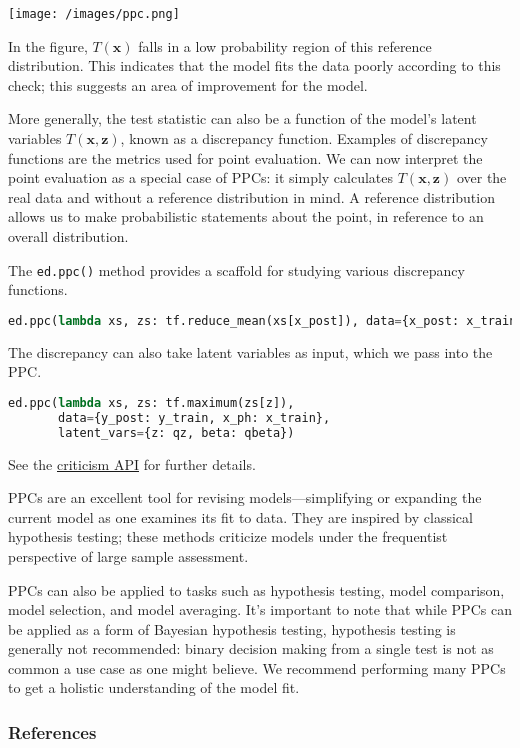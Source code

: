 \texttt{[image: /images/ppc.png]}

In the figure, $T(\mathbf{x})$ falls in a low probability region of
this reference distribution. This indicates that the model fits the
data poorly according to this check; this suggests an area of
improvement for the model.

More generally, the test statistic can also be a function of the
model's latent variables $T(\mathbf{x}, \mathbf{z})$, known as a
discrepancy function.  Examples of discrepancy functions are the
metrics used for point evaluation. We can now interpret the
point evaluation as a special case of PPCs: it simply calculates
$T(\mathbf{x}, \mathbf{z})$ over the real data and without a reference
distribution in mind. A reference distribution allows us to make
probabilistic statements about the point, in reference to an overall
distribution.

The \texttt{ed.ppc()} method provides a scaffold for studying
various discrepancy functions.
\begin{lstlisting}[language=Python]
ed.ppc(lambda xs, zs: tf.reduce_mean(xs[x_post]), data={x_post: x_train})
\end{lstlisting}
The discrepancy can also take latent variables as input, which we pass
into the PPC.
\begin{lstlisting}[language=Python]
ed.ppc(lambda xs, zs: tf.maximum(zs[z]),
       data={y_post: y_train, x_ph: x_train},
       latent_vars={z: qz, beta: qbeta})
\end{lstlisting}

See the \href{/api/criticism}{criticism API} for further details.

PPCs are an excellent tool for revising models---simplifying or
expanding the current model as one examines its fit to data.
They are inspired by classical hypothesis testing; these methods
criticize models under the frequentist perspective of large sample
assessment.

PPCs can also be applied to tasks such as hypothesis testing, model
comparison, model selection, and model averaging.  It's important to
note that while PPCs can be applied as a form of Bayesian hypothesis
testing, hypothesis testing is generally not recommended: binary
decision making from a single test is not as common a use case as one
might believe. We recommend performing many PPCs to get a holistic
understanding of the model fit.

\subsubsection{References}\label{references}
